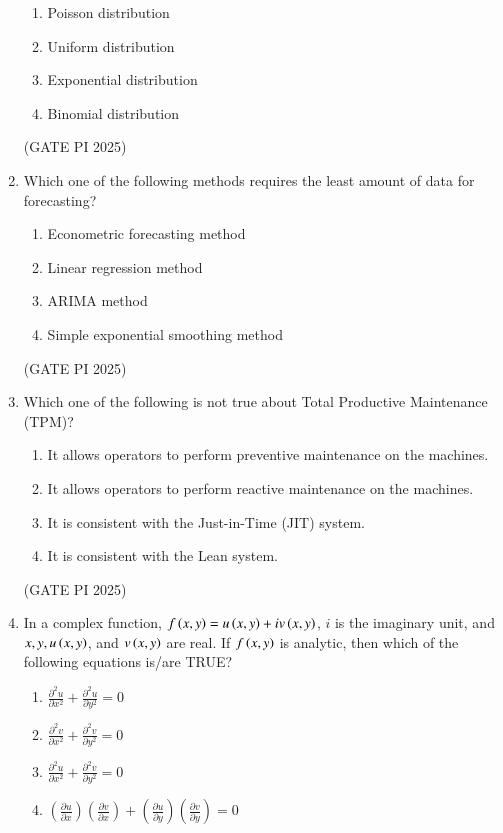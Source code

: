 \documentclass[journal,12pt,onecolumn]{IEEEtran}
\theoremstyle{remark}
\begin{document}
\begin{enumerate}
\begin{multicols}{2}
\begin{enumerate}
    \item Poisson distribution
    \item Uniform distribution
    \item Exponential distribution
    \item Binomial distribution
\end{enumerate}
\end{multicols}

\hfill (GATE PI 2025)

\item Which one of the following methods requires the least amount of data for forecasting?

\begin{enumerate}
    \item Econometric forecasting method
    \item Linear regression method
    \item ARIMA method
    \item Simple exponential smoothing method
\end{enumerate}

\hfill (GATE PI 2025)

\item Which one of the following is not true about Total Productive Maintenance (TPM)?

\begin{enumerate}
    \item It allows operators to perform preventive maintenance on the machines.
    \item It allows operators to perform reactive maintenance on the machines.
    \item It is consistent with the Just-in-Time (JIT) system.
    \item It is consistent with the Lean system.
\end{enumerate}

\hfill (GATE PI 2025)

\item In a complex function, $f\left(x,y\right) = u\left(x,y\right) + i v\left(x,y\right)$, $i$ is the imaginary unit, and $x, y, u\left(x,y\right)$, and $v\left(x,y\right)$ are real. If $f\left(x,y\right)$ is analytic, then which of the following equations is/are TRUE?
\begin{enumerate}
\setlength{\itemsep}{1em}
\item $\frac{\partial^2 u}{\partial x^2} + \frac{\partial^2 u}{\partial y^2} = 0$
\item $\frac{\partial^2 v}{\partial x^2} + \frac{\partial^2 v}{\partial y^2} = 0$
\item $\frac{\partial^2 u}{\partial x^2} + \frac{\partial^2 v}{\partial y^2} = 0$
\item $\left( \frac{\partial u}{\partial x} \right) \left( \frac{\partial v}{\partial x} \right) + \left( \frac{\partial u}{\partial y} \right) \left( \frac{\partial v}{\partial y} \right) = 0$
\end{enumerate}


\end{enumerate}
\end{document}
